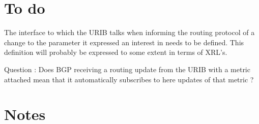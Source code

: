 \documentclass[11pt]{article}
\begin{document}
\section{To do}
The interface to which the URIB talks when informing the routing protocol of a change to the parameter it expressed an interest in needs to be defined. This definition will probably be expressed to some extent in terms of XRL's.

Question : Does BGP receiving a routing update from the URIB with a metric attached mean that it automatically subscribes to here updates of that metric ?

\section{Notes}
\end{document}
